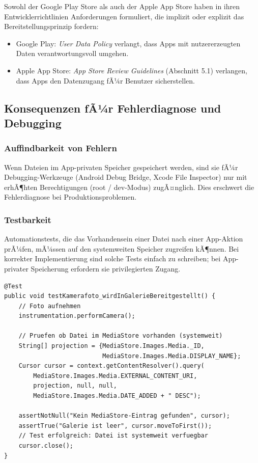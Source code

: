 ﻿\documentclass[12pt, a4paper]{article}
\begin{document}
Sowohl der Google Play Store als auch der Apple App Store haben in ihren
Entwicklerrichtlinien Anforderungen formuliert, die implizit oder explizit
das Bereitstellungsprinzip fordern:

\begin{itemize}[leftmargin=*]
  \item Google Play: \emph{User Data Policy} verlangt, dass Apps mit nutzererzeugten
    Daten verantwortungsvoll umgehen.
  \item Apple App Store: \emph{App Store Review Guidelines} (Abschnitt 5.1)
    verlangen, dass Apps den Datenzugang fÃ¼r Benutzer sicherstellen.
\end{itemize}

\subsection{Konsequenzen fÃ¼r Fehlerdiagnose und Debugging}

\subsubsection{Auffindbarkeit von Fehlern}

Wenn Dateien im App-privaten Speicher gespeichert werden, sind sie fÃ¼r
Debugging-Werkzeuge (Android Debug Bridge, Xcode File Inspector) nur mit
erhÃ¶hten Berechtigungen (root / dev-Modus) zugÃ¤nglich. Dies erschwert
die Fehlerdiagnose bei Produktionsproblemen.

\subsubsection{Testbarkeit}

Automationstests, die das Vorhandensein einer Datei nach einer App-Aktion
prÃ¼fen, mÃ¼ssen auf den systemweiten Speicher zugreifen kÃ¶nnen. Bei
korrekter Implementierung sind solche Tests einfach zu schreiben; bei
App-privater Speicherung erfordern sie privilegierten Zugang.

\begin{lstlisting}[style=android, caption={Automatisierter Test: Pruefung der systemweiten Bereitstellung}]
@Test
public void testKamerafoto_wirdInGalerieBereitgestellt() {
    // Foto aufnehmen
    instrumentation.performCamera();
    
    // Pruefen ob Datei im MediaStore vorhanden (systemweit)
    String[] projection = {MediaStore.Images.Media._ID,
                           MediaStore.Images.Media.DISPLAY_NAME};
    Cursor cursor = context.getContentResolver().query(
        MediaStore.Images.Media.EXTERNAL_CONTENT_URI,
        projection, null, null,
        MediaStore.Images.Media.DATE_ADDED + " DESC");
    
    assertNotNull("Kein MediaStore-Eintrag gefunden", cursor);
    assertTrue("Galerie ist leer", cursor.moveToFirst());
    // Test erfolgreich: Datei ist systemweit verfuegbar
    cursor.close();
}
\end{lstlisting}
\end{document}
